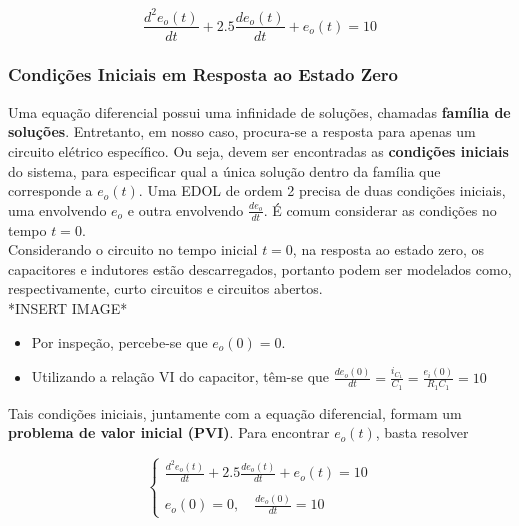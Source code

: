 \documentclass{article}
\numberwithin{equation}{section}
\begin{document}
    \begin{equation}
        \frac{ d^2e_{o}(t) }{ dt }+ 2.5 \frac{ de_{o}(t) }{ dt } + e_{o}(t) = 10
    \end{equation}

    \subsubsection{Condições Iniciais em Resposta ao Estado Zero}
    \label{subsubsec:condinics}

    Uma equação diferencial possui uma infinidade de soluções, chamadas \textbf{família de soluções}. Entretanto, em nosso caso, procura-se a resposta para apenas um circuito elétrico específico. Ou seja, devem ser encontradas as \textbf{condições iniciais} do sistema, para especificar qual a única solução dentro da família que corresponde a $e_{o}(t)$. Uma EDOL de ordem 2 precisa de duas condições iniciais, uma envolvendo $e_{o}$ e outra envolvendo $\displaystyle{\frac{de_{o}}{dt}}$. É comum considerar as condições no tempo $t=0$. \\
    Considerando o circuito no tempo inicial $t=0$, na resposta ao estado zero, os capacitores e indutores estão descarregados, portanto podem ser modelados como, respectivamente, curto circuitos e circuitos abertos. \\
    *INSERT IMAGE*
    \begin{itemize}
        \item Por inspeção, percebe-se que $e_{o}(0) = 0$.
        \item Utilizando a relação VI do capacitor, têm-se que $\displaystyle{\frac{ de_{o}(0) }{ dt }= \frac{ i_{ C{_1} } } { C_{1} } } = \frac{ e_{i}(0) }{ R_{1}C_{1} } = 10$
    \end{itemize}

    Tais condições iniciais, juntamente com a equação diferencial, formam um \textbf{problema de valor inicial (PVI)}. Para encontrar $e_{o}(t)$, basta resolver

    \begin{equation}
        \begin{cases}
            \displaystyle\frac{ d^2e_{o}(t) }{ dt }+ 2.5 \frac{ de_{o}(t) }{ dt } + e_{o}(t) = 10\\ \\
            \displaystyle e_{o}(0) = 0, \quad \frac{de_o(0)}{dt}=10
        \end{cases}
    \end{equation}
\end{document}
